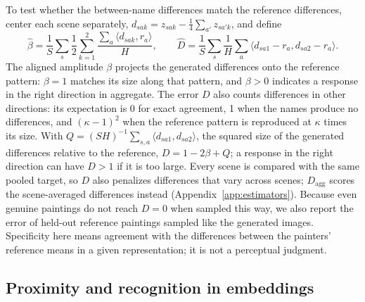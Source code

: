 \documentclass[10pt]{article}
\newcommand{\ip}[2]{\langle #1,#2\rangle}
\begin{document}
To test whether the between-name differences match the reference differences, center each scene
separately, $d_{sak}=z_{sak}-\frac14\sum_{a'}z_{sa'k}$, and define
\begin{equation}
\widehat\beta=\frac1S\sum_s\frac{1}{2}\sum_{k=1}^2\frac{\sum_a\ip{d_{sak}}{r_a}}{H},\qquad
\widehat D=\frac1S\sum_s\frac1H\sum_a\ip{d_{sa1}-r_a}{d_{sa2}-r_a}.
\label{eq:beta-d}
\end{equation}
The aligned amplitude $\beta$ projects the generated differences onto the reference pattern:
$\beta=1$ matches its size along that pattern, and $\beta>0$ indicates a response in the right
direction in aggregate. The error $D$ also counts differences in other directions: its
expectation is 0 for exact agreement, 1 when the names produce no differences, and
$(\kappa-1)^2$ when the reference pattern is reproduced at $\kappa$ times its size. With
$Q=(SH)^{-1}\sum_{s,a}\ip{d_{sa1}}{d_{sa2}}$, the squared size of the generated differences
relative to the reference, $D=1-2\beta+Q$; a response in the right direction can have $D>1$ if it
is too large. Every scene is compared with the same pooled target, so $D$ also penalizes
differences that vary across scenes; $D_{\mathrm{agg}}$ scores the scene-averaged differences
instead (Appendix~\ref{app:estimators}). Because even genuine paintings do not reach $D=0$ when
sampled this way, we also report the error of held-out reference paintings sampled like the
generated images. Specificity here means agreement with the differences between the painters'
reference means in a given representation; it is not a perceptual judgment.

\subsection{Proximity and recognition in embeddings}\label{sec:proximity}
\end{document}
